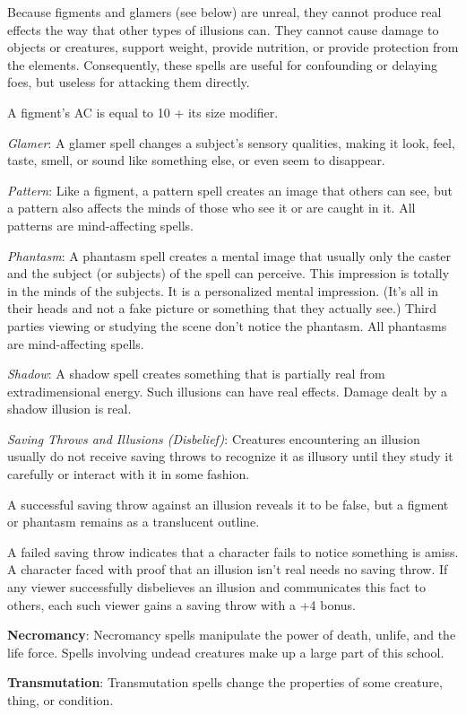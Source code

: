 Because figments and glamers (see below) are unreal, they cannot produce real effects the way that other types of illusions can. They cannot cause damage to objects or creatures, support weight, provide nutrition, or provide protection from the elements. Consequently, these spells are useful for confounding or delaying foes, but useless for attacking them directly.

A figment's AC is equal to 10 + its size modifier.

\textit{Glamer}: A glamer spell changes a subject's sensory qualities, making it look, feel, taste, smell, or sound like something else, or even seem to disappear.

\textit{Pattern}: Like a figment, a pattern spell creates an image that others can see, but a pattern also affects the minds of those who see it or are caught in it. All patterns are mind-affecting spells.

\textit{Phantasm}: A phantasm spell creates a mental image that usually only the caster and the subject (or subjects) of the spell can perceive. This impression is totally in the minds of the subjects. It is a personalized mental impression. (It's all in their heads and not a fake picture or something that they actually see.) Third parties viewing or studying the scene don't notice the phantasm. All phantasms are mind-affecting spells.

\textit{Shadow}: A shadow spell creates something that is partially real from extradimensional energy. Such illusions can have real effects. Damage dealt by a shadow illusion is real.

\textit{Saving Throws and Illusions (Disbelief)}: Creatures encountering an illusion usually do not receive saving throws to recognize it as illusory until they study it carefully or interact with it in some fashion.

A successful saving throw against an illusion reveals it to be false, but a figment or phantasm remains as a translucent outline.

A failed saving throw indicates that a character fails to notice something is amiss. A character faced with proof that an illusion isn't real needs no saving throw. If any viewer successfully disbelieves an illusion and communicates this fact to others, each such viewer gains a saving throw with a +4 bonus.

\textbf{Necromancy}: Necromancy spells manipulate the power of death, unlife, and the life force. Spells involving undead creatures make up a large part of this school.

\textbf{Transmutation}: Transmutation spells change the properties of some creature, thing, or condition.